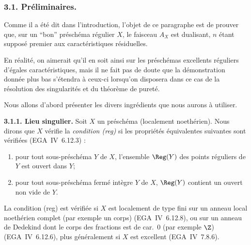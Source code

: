 \subsubsection*{3.1. Préliminaires.}

Comme il a été dit dans l'introduction, l'objet de ce paragraphe est de prouver que, sur un ``bon'' préschéma régulier $X$, le faisceau $A_X$ est dualisant, $n$ étant supposé premier aux caractéristiques résiduelles.

En réalité, on aimerait qu'il en soit ainsi sur les préschémas excellents réguliers d'égales caractéristiques, mais il ne fait pas de doute que la démonstration donnée plus bas s'étendra à ceux-ci lorsqu'on disposera dans ce cas de la résolution des singularités et du théorème de pureté.

Nous allons d'abord présenter les divers ingrédients que nous aurons à utiliser.

\textbf{3.1.1. Lieu singulier.} Soit $X$ un préschéma (localement noethérien). Nous dirons que $X$ vérifie la \emph{condition (reg)} si les propriétés équivalentes suivantes sont vérifiées (EGA~IV~6.12.3) :
\begin{enumerate}
\item[(i)] pour tout sous-préschéma $Y$ de $X$, l'ensemble $\Reg(Y)$ des points réguliers de $Y$ est ouvert dans $Y$;
\item[(ii)] pour tout sous-préschéma fermé intègre $Y$ de $X$, $\Reg(Y)$ contient un ouvert non vide de $Y$.
\end{enumerate}

La condition (reg) est vérifiée si $X$ est localement de type fini sur un anneau local noethérien complet (par exemple un corps) (EGA~IV~6.12.8), ou sur un anneau de Dedekind dont le corps des fractions est de car.~0 (par exemple $\Z$) (EGA~IV~6.12.6), plus généralement si $X$ est excellent (EGA~IV~7.8.6).


